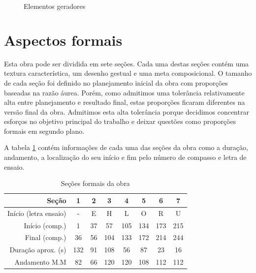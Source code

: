 \begin{figure}
  \centering

  \caption{Elementos geradores}
  \label{fig:elementos-geradores}
\end{figure}

\section{Aspectos formais}
\label{sec:aspectos-formais}

Esta obra pode ser dividida em sete seções. Cada uma destas seções
contém uma textura característica, um desenho gestual e uma meta
composicional.
O tamanho de cada seção foi definido no planejamento inicial da obra
com proporções baseadas na razão áurea.
Porém, como admitimos uma tolerância relativamente alta entre
planejamento e resultado final, estas proporções ficaram diferentes na
versão final da obra.
Admitimos esta alta tolerância porque decidimos concentrar esforços no
objetivo principal do trabalho e deixar questões como proporções
formais em segundo plano.

A tabela \ref{tab:secoes-obra} contém informações de cada uma das
seções da obra como a duração, andamento, a localização do seu início
e fim pelo número de compasso e letra de ensaio.

\begin{table}
  \centering
  \begin{tabular}{r|ccccccc}
    Seção & 1 & 2 & 3 & 4 & 5 & 6 & 7 \\
    \hline
    Início (letra ensaio) & - & E & H & L & O & R & U \\
    Início (comp.) & 1 & 37 & 57 & 105 & 134 & 173 & 215 \\
    Final (comp.) & 36 & 56 & 104 & 133 & 172 & 214 & 244 \\
    Duração aprox. (s) & 132 & 91 & 108 & 56 & 87 & 23 & 16\\
    Andamento M.M & 82 & 66 & 120 & 120 & 108 & 112 & 112 \\
  \end{tabular}
  \caption{Seções formais da obra}
  \label{tab:secoes-obra}
\end{table}

